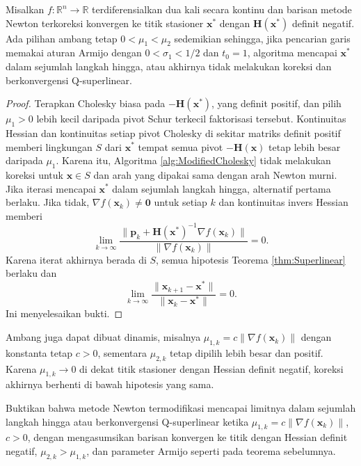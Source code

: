 \begin{theorem} Misalkan $f:\mathbb{R}^n\rightarrow\mathbb{R}$ terdiferensialkan dua kali secara kontinu dan barisan metode Newton terkoreksi konvergen ke titik stasioner $\mathbf{x}^*$ dengan $\mathbf{H}(\mathbf{x}^*)$ definit negatif. Ada pilihan ambang tetap $0<\mu_1<\mu_2$ sedemikian sehingga, jika pencarian garis memakai aturan Armijo dengan $0<\sigma_1<1/2$ dan $t_0=1$, algoritma mencapai $\mathbf{x}^*$ dalam sejumlah langkah hingga, atau akhirnya tidak melakukan koreksi dan berkonvergensi Q-superlinear.
\end{theorem}
\begin{proof}
Terapkan Cholesky biasa pada $-\mathbf{H}(\mathbf{x}^*)$, yang definit positif, dan pilih $\mu_1>0$ lebih kecil daripada pivot Schur terkecil faktorisasi tersebut. Kontinuitas Hessian dan kontinuitas setiap pivot Cholesky di sekitar matriks definit positif memberi lingkungan $S$ dari $\mathbf{x}^*$ tempat semua pivot $-\mathbf{H}(\mathbf{x})$ tetap lebih besar daripada $\mu_1$. Karena itu, Algoritma \ref{alg:ModifiedCholesky} tidak melakukan koreksi untuk $\mathbf{x}\in S$ dan arah yang dipakai sama dengan arah Newton murni. Jika iterasi mencapai $\mathbf{x}^*$ dalam sejumlah langkah hingga, alternatif pertama berlaku. Jika tidak, $\nabla f(\mathbf{x}_k)\neq\mathbf{0}$ untuk setiap $k$ dan kontinuitas invers Hessian memberi
\begin{displaymath}
\lim_{k\to\infty}
\frac{\lVert\mathbf{p}_k+\mathbf{H}(\mathbf{x}^*)^{-1}\nabla f(\mathbf{x}_k)\rVert}
{\lVert\nabla f(\mathbf{x}_k)\rVert}=0.
\end{displaymath}
Karena iterat akhirnya berada di $S$, semua hipotesis Teorema \ref{thm:Superlinear} berlaku dan
\begin{displaymath}
\lim_{k\to\infty}
\frac{\lVert\mathbf{x}_{k+1}-\mathbf{x}^*\rVert}
{\lVert\mathbf{x}_k-\mathbf{x}^*\rVert}=0.
\end{displaymath}
Ini menyelesaikan bukti.
\end{proof}

\begin{remark} Ambang juga dapat dibuat dinamis, misalnya $\mu_{1,k}=c\lVert\nabla f(\mathbf{x}_k)\rVert$ dengan konstanta tetap $c>0$, sementara $\mu_{2,k}$ tetap dipilih lebih besar dan positif. Karena $\mu_{1,k}\to0$ di dekat titik stasioner dengan Hessian definit negatif, koreksi akhirnya berhenti di bawah hipotesis yang sama.
\end{remark}

\begin{exercise} Buktikan bahwa metode Newton termodifikasi mencapai limitnya dalam sejumlah langkah hingga atau berkonvergensi Q-superlinear ketika $\mu_{1,k}=c\lVert\nabla f(\mathbf{x}_k)\rVert$, $c>0$, dengan mengasumsikan barisan konvergen ke titik dengan Hessian definit negatif, $\mu_{2,k}>\mu_{1,k}$, dan parameter Armijo seperti pada teorema sebelumnya.
\end{exercise}

